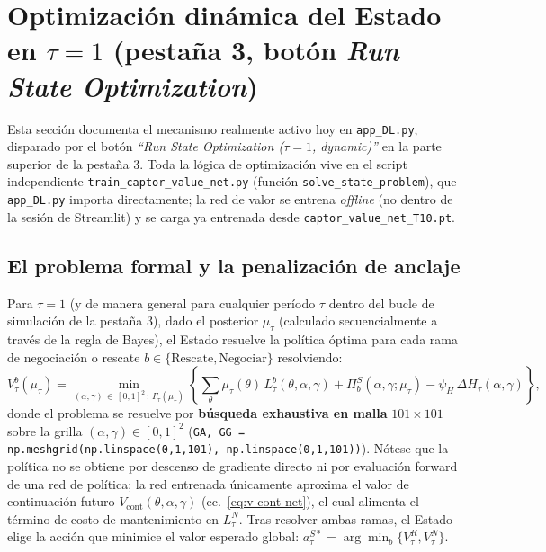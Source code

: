\documentclass[ecta,nameyear,draft]{econsocart}
\newcommand{\pyfile}[1]{\texttt{#1}}
\newcommand{\pyvar}[1]{\texttt{#1}}
\begin{document}
\section{Optimización dinámica del Estado en $\tau=1$ (pestaña 3, botón \emph{Run State Optimization})}\label{sec:tau1-opt}

Esta sección documenta el mecanismo realmente activo hoy en \pyfile{app\_DL.py}, disparado por
el botón \emph{``Run State Optimization ($\tau=1$, dynamic)''} en la parte superior de la
pestaña 3. Toda la lógica de optimización vive en el script independiente
\pyfile{train\_captor\_value\_net.py} (función \pyvar{solve\_state\_problem}), que
\pyfile{app\_DL.py} importa directamente; la red de valor se entrena \emph{offline} (no dentro
de la sesión de Streamlit) y se carga ya entrenada desde \pyfile{captor\_value\_net\_T10.pt}.

\subsection{El problema formal y la penalización de anclaje}

Para $\tau=1$ (y de manera general para cualquier período $\tau$ dentro del bucle de simulación de la pestaña 3), dado el posterior $\mu_\tau$ (calculado secuencialmente a través de la regla de Bayes), el Estado resuelve la política óptima para cada rama de negociación o rescate $b\in\{\text{Rescate},\text{Negociar}\}$ resolviendo:
\begin{equation}
\label{eq:tau1-objective}
V_\tau^b(\mu_\tau) = \min_{(\alpha,\gamma)\,\in\,[0,1]^2 \,:\, \Gamma_\tau(\mu_\tau)}
\left\{\sum_\theta \mu_\tau(\theta)\,L_\tau^b(\theta,\alpha,\gamma) + \Pi^S_b(\alpha,\gamma;\mu_\tau) -
\psi_H\,\Delta H_\tau(\alpha,\gamma)\right\},
\end{equation}
donde el problema se resuelve por \textbf{búsqueda exhaustiva en malla} $101\times101$ sobre la grilla $(\alpha,\gamma) \in [0,1]^2$ (\pyvar{GA, GG = np.meshgrid(np.linspace(0,1,101), np.linspace(0,1,101))}). Nótese que la política no se obtiene por descenso de gradiente directo ni por evaluación forward de una red de política; la red entrenada únicamente aproxima el valor de continuación futuro $V_{\mathrm{cont}}(\theta,\alpha,\gamma)$ (ec.~\ref{eq:v-cont-net}), el cual alimenta el término de costo de mantenimiento en $L_\tau^N$. Tras resolver ambas ramas, el Estado elige la acción que minimice el valor esperado global: $a_\tau^{S\ast}=\arg\min_{b} \{V_\tau^R, V_\tau^N\}$.
\end{document}
